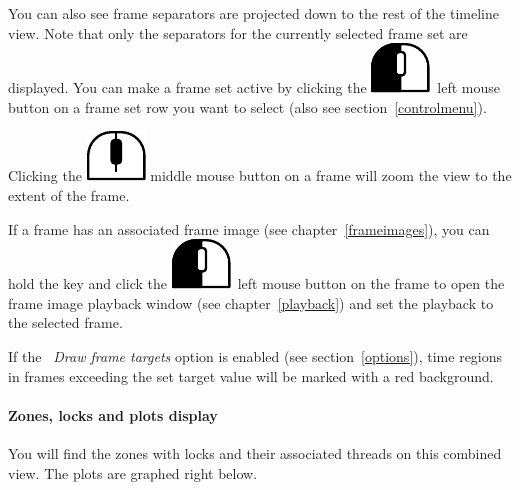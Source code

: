 \documentclass[hidelinks,titlepage,a4paper]{article}
\newcommand{\LMB}{\includegraphics[height=.8\baselineskip]{icons/lmb}}
\newcommand{\MMB}{\includegraphics[height=.8\baselineskip]{icons/mmb}}
\begin{document}
You can also see frame separators are projected down to the rest of the timeline view. Note that only the separators for the currently selected frame set are displayed. You can make a frame set active by clicking the \LMB{}~left mouse button on a frame set row you want to select (also see section~\ref{controlmenu}).

Clicking the \MMB{} middle mouse button on a frame will zoom the view to the extent of the frame.

If a frame has an associated frame image (see chapter~\ref{frameimages}), you can hold the \keys{\ctrl} key and click the \LMB{}~left mouse button on the frame to open the frame image playback window (see chapter~\ref{playback}) and set the playback to the selected frame.

If the \emph{\faFlagCheckered{}~Draw frame targets} option is enabled (see section~\ref{options}), time regions in frames exceeding the set target value will be marked with a red background.

\paragraph{Zones, locks and plots display}
\label{zoneslocksplots}

You will find the zones with locks and their associated threads on this combined view. The plots are graphed right below.
\end{document}
